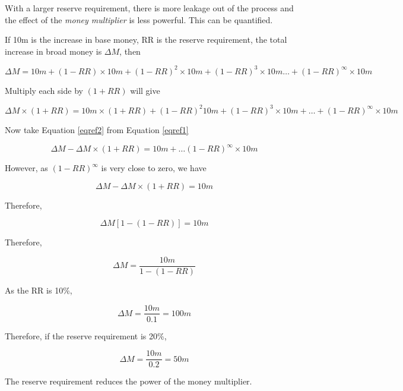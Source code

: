 \documentclass[14pt]{article}
\begin{document}
\begin{enumerate}
With a larger reserve requirement, there is more leakage out of the process and the effect of the \emph{money multiplier} is less powerful. This can be quantified. 

If 10m is the increase in base money, RR is the reserve requirement, the total increase in broad money is $\Delta M$, then

\begin{equation}\label{eqref1}
\Delta M = 10m + (1-RR) \times 10m + (1-RR)^2 \times 10m + (1-RR)^3 \times 10m \dots + (1-RR)^{\infty} \times 10m
\end{equation}

Multiply each side by $(1+RR)$ will give

\begin{equation}\label{eqref2}
\Delta M \times (1+RR) = 10m \times (1+RR) + (1-RR)^2 10m + (1-RR)^3 \times 10m + \dots + (1-RR)^{\infty} \times 10m
\end{equation}

Now take Equation \ref{eqref2} from Equation \ref{eqref1}

\begin{equation}\label{eqref3}
\Delta M - \Delta M \times (1+RR) = 10m + \dots (1-RR)^{\infty} \times 10m
\end{equation}

However, as $(1-RR)^{\infty}$ is very close to zero, we have 

\begin{equation}
\Delta M - \Delta M \times (1+RR) = 10m
\end{equation} 

Therefore, 

\begin{equation}
\Delta M \left [1 - (1-RR) \right] = 10m
\end{equation}

Therefore, 

\begin{equation}
\Delta M = \frac{10m}{1 - (1-RR)}  
\end{equation}

As the RR is 10\%, 

\begin{equation*}
\Delta M = \frac{10m}{0.1} = 100m
\end{equation*}

Therefore, if the reserve requirement is 20\%, 

\begin{equation*}
\Delta M = \frac{10m}{0.2} = 50m
\end{equation*}

The reserve requirement reduces the power of the money multiplier.

\end{enumerate}
\end{document}

